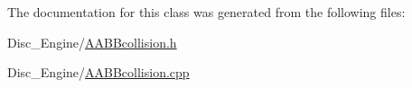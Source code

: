 The documentation for this class was generated from the following files\+:\begin{DoxyCompactItemize}
\item 
Disc\+\_\+\+Engine/\mbox{\hyperlink{_a_a_b_bcollision_8h}{A\+A\+B\+Bcollision.\+h}}\item 
Disc\+\_\+\+Engine/\mbox{\hyperlink{_a_a_b_bcollision_8cpp}{A\+A\+B\+Bcollision.\+cpp}}\end{DoxyCompactItemize}
